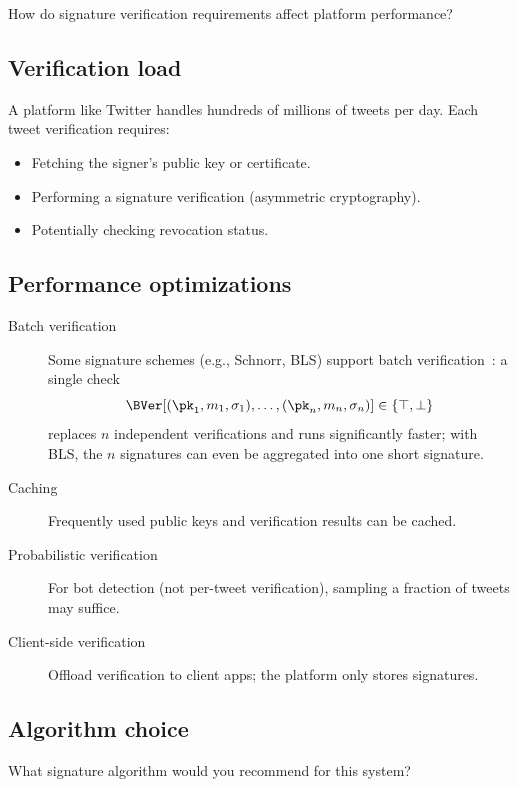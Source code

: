 \begin{exercise}
  How do signature verification requirements affect platform
  performance?
\end{exercise}

\subsection{Verification load}

A platform like Twitter handles hundreds of millions of tweets per day.
Each tweet verification requires:
\begin{itemize}
  \item Fetching the signer's public key or certificate.
  \item Performing a signature verification (asymmetric cryptography).
  \item Potentially checking revocation status.
\end{itemize}

\subsection{Performance optimizations}

\begin{description}
  \item[Batch verification] Some signature schemes (e.g., Schnorr,
    BLS) support batch verification~\autocite{BGR1998batch}: a single
    check
    \[
      \BVer[(\pk_1, m_1, \sigma_1), \ldots, (\pk_n, m_n, \sigma_n)]
      \in \{\top, \bot\}
    \]
    replaces \(n\) independent verifications and runs significantly
    faster; with BLS, the \(n\) signatures can even be aggregated into
    one short signature.
  \item[Caching] Frequently used public keys and verification results
    can be cached.
  \item[Probabilistic verification] For bot detection (not per-tweet
    verification), sampling a fraction of tweets may suffice.
  \item[Client-side verification] Offload verification to client apps;
    the platform only stores signatures.
\end{description}

\subsection{Algorithm choice}

\begin{exercise}
  What signature algorithm would you recommend for this system?
\end{exercise}

